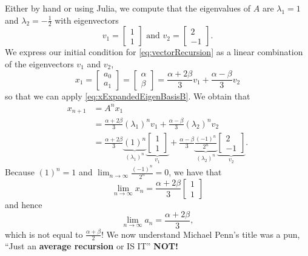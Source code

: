 Either by hand or using Julia, we compute that the eigenvalues of $A$ are $\lambda_1 = 1$ and $\lambda_2 = -\frac{1}{2}$ with eigenvectors
$$ v_1 = \left[ \begin{array}{r}
         1\\
        1
    \end{array}\right] \text{ and } v_2 = \left[ \begin{array}{r}
         2\\
        -1
    \end{array}\right].$$
We express our initial condition for \eqref{eq:vectorRecursion} as a linear combination of the eigenvectors $v_1$ and $v_2$, 
\begin{equation}
    \label{eq:Mpennx0}
    x_1 =  \left[ \begin{array}{l}
         a_{0}\\
         a_{1} 
    \end{array}\right] = \left[ \begin{array}{l}
         \alpha\\
         \beta 
    \end{array}\right] = \frac{\alpha + 2 \beta}{3} v_1 + \frac{\alpha-\beta}{3} v_2
\end{equation}
so that we can apply \eqref{eq:xExpandedEigenBasisB}. We obtain that 
\begin{equation}
\label{eq:mPennEigenStuff}
\begin{aligned}
    x_{n+1} & = A^n x_1  \\
    & = \frac{\alpha + 2 \beta}{3} (\lambda_1)^n v_1  +  \frac{\alpha-\beta}{3} (\lambda_2)^n v_2\\
     & = \frac{\alpha + 2 \beta}{3} \underbrace{(1)^n}_{(\lambda_1)^n}  \underbrace{\left[ \begin{array}{r}
         1\\
        1
    \end{array}\right]}_{v_1}  + \frac{\alpha-\beta}{3}  \underbrace{\frac{(-1)^n}{2^n}}_{(\lambda_2)^n} \underbrace{ \left[ \begin{array}{r}
         2\\
        -1
    \end{array}\right]}_{v_2}.
\end{aligned}   
\end{equation}
Because $(1)^n =1$ and $\lim_{n\to \infty} \frac{(-1)^n}{2^n} = 0$, we have that
$$ \lim_{n \to \infty} x_n = \frac{\alpha + 2 \beta}{3}   \left[ \begin{array}{r}
         1\\
        1
    \end{array}\right] $$
    and hence
$$    \boxed{ \lim_{n \to \infty} a_n = \frac{\alpha + 2 \beta}{3},}$$
which is not equal to $\frac{\alpha + \beta}{2}$! We now understand Michael Penn's title was a pun, ``Just an \textbf{average recursion} or IS IT'' \textbf{NOT!}

